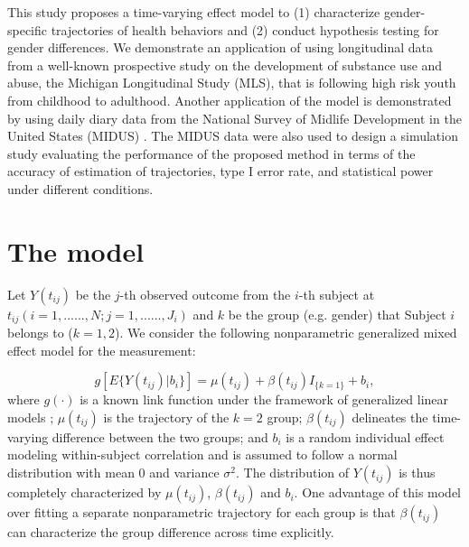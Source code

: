 This study proposes a time-varying effect model to (1)
characterize gender-specific trajectories of health behaviors and
(2) conduct hypothesis testing for gender differences. We
demonstrate an application of 
using longitudinal data
from a well-known prospective study on the development of
substance use and abuse, the Michigan Longitudinal Study
(MLS)\cite{zucker96}, that is following high risk youth from
childhood to adulthood. Another application of the model is
demonstrated by using daily diary data from the National Survey of
Midlife Development in the United States (MIDUS) \cite{ryff10}.
The MIDUS data were also used to design a simulation study
evaluating the performance of the proposed method in terms of the
accuracy of estimation of trajectories, type I error rate, and
statistical power under different conditions.


\section{The model}

Let $Y(t_{ij})$ be the $j$-th observed outcome from the $i$-th
subject at $t_{ij} (i=1,......,N; j=1,......,J_i)$ and $k$ be the
group (e.g. gender) that Subject $i$ belongs to ($k=1,2$). We
consider the following nonparametric generalized mixed effect
model for the measurement:

\begin{equation}\label{Model}
g[E\{Y(t_{ij})|b_{i}\}]=\mu(t_{ij})+\beta(t_{ij})I_{\{k=1\}}+b_i,
\end{equation}
where $g(\cdot)$ is a known link function under the framework of
generalized linear models \cite{mccullagh89}; $\mu(t_{ij})$ is the
trajectory of the $k=2$ group; $\beta(t_{ij})$ delineates the
time-varying difference between the two groups; and $b_i$ is a
random individual effect modeling within-subject correlation and
is assumed to follow a normal distribution with mean 0 and
variance $\sigma^2$. The distribution of $Y(t_{ij})$ is thus
completely characterized by $\mu(t_{ij})$, $\beta(t_{ij})$ and
$b_i$. One advantage of this model over fitting a separate
nonparametric trajectory for each group is that $\beta(t_{ij})$
can characterize the group difference across time explicitly.


